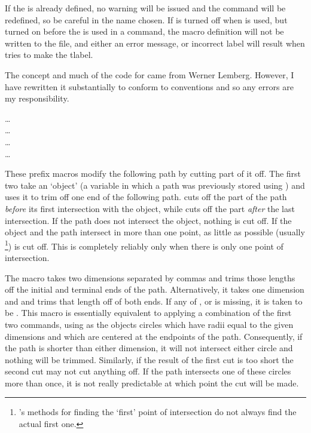 \documentclass[letterpaper]{article}
\begin{document}
If the  is already defined, no warning will be issued
and the command will be redefined, so be careful in the name chosen.
If  is turned off when  is used, but
turned on before the  is used in a 
command, the macro definition will not be written to the 
file, and either an error message, or incorrect label will result
when \MP{} tries to make the tlabel.

The concept and much of the code for  came from Werner
Lemberg. However, I have rewritten it substantially to conform to \mfp{}
conventions and so any errors are my responsibility.

\begin{cd}
\dots\\
\dots\\
\dots\\
\dots%
%
%
%
\end{cd}

These prefix macros modify the following path by cutting part of it off.
The first two take an `object' (a variable in which a path was
previously stored using ) and uses it to trim off one end of the
following path.  cuts off the part of the path
\emph{before} its first intersection with the object, while
 cuts off the part \emph{after} the last intersection.
If the path does not intersect the object, nothing is cut off. If the
object and the path intersect in more than one point, as little as
possible (usually%
    \footnote{\MF{}'s methods for finding the `first' point of
    intersection do not always find the actual first one.}) %
is cut off. This is completely reliably only when there is only one
point of intersection.

The  macro takes two dimensions separated by commas and
trims those lengths off the initial and terminal ends of the path.
Alternatively, it takes one dimension and and trims that length off of
both ends. If any of ,  or  is
missing, it is taken to be \dim{0pt}. This macro is essentially
equivalent to applying a combination of the first two commands, using as
the objects circles which have radii equal to the given dimensions and
which are centered at the endpoints of the path. Consequently, if the
path is shorter than either dimension, it will not intersect either
circle and nothing will be trimmed. Similarly, if the result of the
first cut is too short the second cut may not cut anything off. If the
path intersects one of these circles more than once, it is not really
predictable at which point the cut will be made.
\end{document}
